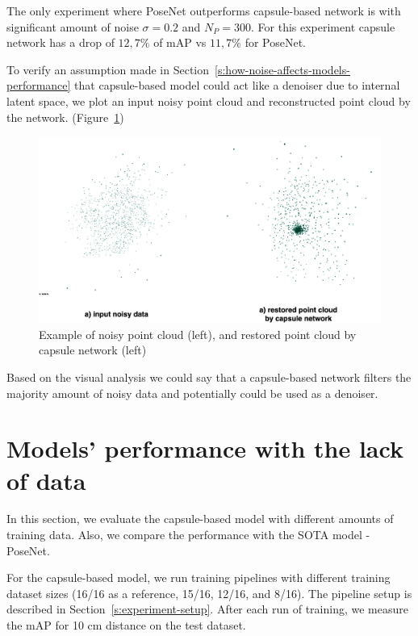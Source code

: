 The only experiment where PoseNet outperforms capsule-based network is with significant amount of noise $\sigma = 0.2$ and $N_P = 300$. For this experiment capsule network has a drop of $12,7\%$ of mAP vs $11,7\%$ for PoseNet.

To verify an assumption made in Section~\ref{s:how-noise-affects-models-performance} that capsule-based model could act like a denoiser due to internal latent space, we plot an input noisy point cloud and reconstructed point cloud by the network. (Figure~\ref{img:denoising})

\begin{figure}[htbp]
    \centerline{\includegraphics[scale=0.2]{Figures/noise-resporation.png}}
    \caption{Example of noisy point cloud (left), and restored point cloud by capsule network (left)}
    \label{img:denoising}
\end{figure}

Based on the visual analysis we could say that a capsule-based network filters the majority amount of noisy data and potentially could be used as a denoiser.

\section{Models' performance with the lack of data}
\label{s:experiment-lack-of-data}
In this section, we evaluate the capsule-based model with different amounts of training data. Also, we compare the performance with the SOTA model - PoseNet.

For the capsule-based model, we run training pipelines with different training dataset sizes (16/16 as a reference, 15/16, 12/16, and 8/16). The pipeline setup is described in Section~\ref{s:experiment-setup}. After each run of training, we measure the mAP for 10 cm distance on the test dataset.

